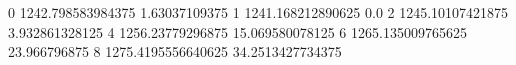 0 1242.798583984375 1.63037109375
1 1241.168212890625 0.0
2 1245.10107421875 3.932861328125
4 1256.23779296875 15.069580078125
6 1265.135009765625 23.966796875
8 1275.4195556640625 34.2513427734375
